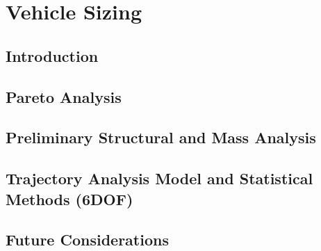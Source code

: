 \section{Vehicle Sizing}
\subsection{Introduction}
\subsection{Pareto Analysis}
\subsection{Preliminary Structural and Mass Analysis}
\subsection{Trajectory Analysis Model and Statistical Methods (6DOF)}
\subsection{Future Considerations}